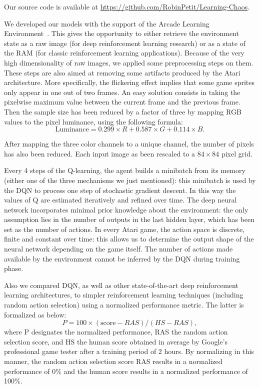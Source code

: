 \documentclass[letterpaper]{article}
\begin{document}
Our source code is available at \url{https://github.com/RobinPetit/Learning-Chaos}.

We developed our models with the support of the Arcade Learning Environment~\citep{bellemare13arcade}. This gives the opportunity to either
retrieve the environment state as a raw image (for deep reinforcement learning research) or as a state of the RAM (for classic reinforcement learning
applications). Because of the very high dimensionality of raw images, we applied some preprocessing steps on them. These steps are also aimed at
removing some artifacts produced by the Atari architecture. More specifically, the flickering effect implies that some game sprites only appear
in one out of two frames. An easy solution consists in taking the pixelwise maximum value between the current frame and the previous frame.
Then the sample size has been reduced by a factor of three by mapping RGB values to the pixel luminance, using the following formula:
\begin{equation}
    \text{Luminance} = 0.299 \times R + 0.587 \times G + 0.114 \times B.
\end{equation}

After mapping the three color channels to a unique channel, the number of pixels has also been reduced. Each input image as been rescaled to a
$84 \times 84$ pixel grid.

Every 4 steps of the Q-learning, the agent builds a minibatch from its memory (either one of the three mechanisms we just mentioned):
this minibatch is used by the DQN to process one step of stochastic gradient descent. In this way the values of Q are estimated iteratively and
refined over time. The deep neural network incorporates minimal prior knowledge about the environment: the only assumption lies in the number of
outputs in the last hidden layer, which has been set as the number of actions. In every Atari game, the action space is discrete, finite and constant over time:
this allows us to determine the output shape of the neural network depending on the game itself. The number of actions made available by the environment
cannot be inferred by the DQN during training phase.

Also we compared DQN, as well as other state-of-the-art deep reinforcement learning architectures, to simpler reinforcement learning techniques (including
random action selection) using a normalized performance metric. The latter is formalized as below:
\begin{equation}
    P = 100 \times (\text{score} - RAS) / (HS - RAS),
\end{equation}
where P designates the normalized performance, RAS the random action selection score, and HS the human score obtained in average by Google's professional
game tester after a training period of 2 hours.  By normalizing in this manner, the random action selection score RAS results in a normalized performance
of 0\% and the human score results in a normalized performance of 100\%.
\end{document}
